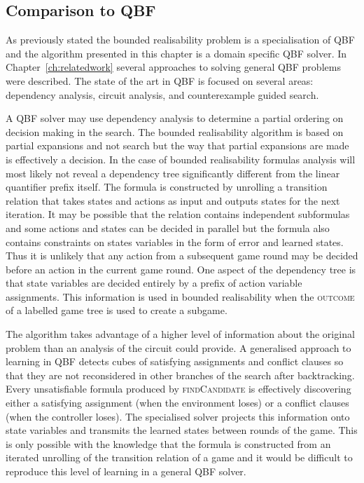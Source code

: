 \subsection{Comparison to QBF}

As previously stated the bounded realisability problem is a specialisation of QBF and the algorithm presented in this chapter is a domain specific QBF solver. In Chapter~\ref{ch:relatedwork} several approaches to solving general QBF problems were described. The state of the art in QBF is focused on several areas: dependency analysis, circuit analysis, and counterexample guided search. 

A QBF solver may use dependency analysis to determine a partial ordering on decision making in the search. The bounded realisability algorithm is based on partial expansions and not search but the way that partial expansions are made is effectively a decision. In the case of bounded realisability formulas analysis will most likely not reveal a dependency tree significantly different from the linear quantifier prefix itself. The formula is constructed by unrolling a transition relation that takes states and actions as input and outputs states for the next iteration. It may be possible that the relation contains independent subformulas and some actions and states can be decided in parallel but the formula also contains constraints on states variables in the form of error and learned states. Thus it is unlikely that any action from a subsequent game round may be decided before an action in the current game round. One aspect of the dependency tree is that state variables are decided entirely by a prefix of action variable assignments. This information is used in bounded realisability when the \textsc{outcome} of a labelled game tree is used to create a subgame. 

The algorithm takes advantage of a higher level of information about the original problem than an analysis of the circuit could provide. A generalised approach to learning in QBF detects cubes of satisfying assignments and conflict clauses so that they are not reconsidered in other branches of the search after backtracking. Every unsatisfiable formula produced by \textsc{findCandidate} is effectively discovering either a satisfying assignment (when the environment loses) or a conflict clauses (when the controller loses). The specialised solver projects this information onto state variables and transmits the learned states between rounds of the game. This is only possible with the knowledge that the formula is constructed from an iterated unrolling of the transition relation of a game and it would be difficult to reproduce this level of learning in a general QBF solver.

